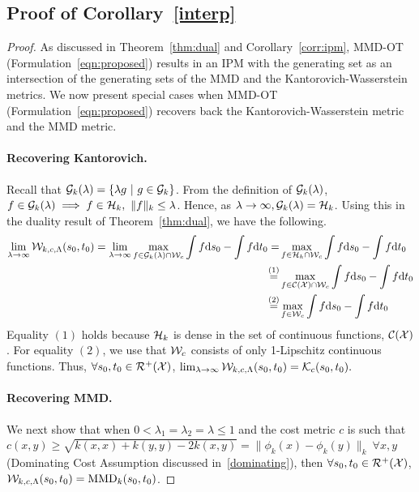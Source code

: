 \subsection[Proof of MMD-OT Interpolating between Kantorovich and MMD]{Proof of Corollary~\ref{interp}}\label{proof:corr-interp}
\interpolant*
\begin{proof}
As discussed in Theorem~\ref{thm:dual} and Corollary~\ref{corr:ipm}, MMD-OT (Formulation~\ref{eqn:proposed}) results in an IPM with the generating set as an intersection of the generating sets of the MMD and the Kantorovich-Wasserstein metrics.
We now present special cases when MMD-OT (Formulation~\ref{eqn:proposed}) recovers back the Kantorovich-Wasserstein metric and the MMD metric.
\paragraph{Recovering Kantorovich.} Recall that $\mathcal{G}_k(\lambda)=\{\lambda g~|~ g\in \mathcal{G}_k\}$. From the definition of $\mathcal{G}_k(\lambda)$, $f\in \mathcal{G}_k(\lambda)\implies f\in \mathcal{H}_k,~ \|f\|_k\leq \lambda$. Hence, as $\lambda\rightarrow \infty, \mathcal{G}_k(\lambda)=\mathcal{H}_k$. Using this in the duality result of Theorem~\ref{thm:dual}, we have the following.
\begin{align*}
\lim_{\lambda\rightarrow \infty}\mathcal{W}_{k, c, \Lambda}(s_0, t_0)=\lim_{\lambda\rightarrow \infty}\max\limits_{f\in \mathcal{G}_k(\lambda)\cap \mathcal{W}_c}\int f \textup{d}s_0 - \int f \textup{d}t_0=&\max\limits_{f\in \mathcal{H}_k\cap \mathcal{W}_c}\int f \textup{d}s_0 - \int f \textup{d}t_0\\
\stackrel{(1)}{=}& \max\limits_{f\in \mathcal{C}(\mathcal{X})\cap \mathcal{W}_c}\int f \textup{d}s_0 - \int f \textup{d}t_0\\
\stackrel{(2)}{=}& \max\limits_{f\in \mathcal{W}_c}\int f \textup{d}s_0 - \int f \textup{d}t_0
\end{align*}
Equality $(1)$ holds because $\mathcal{H}_k$ is dense in the set of continuous functions, $\mathcal{C}(\mathcal{X})$. For equality $(2)$, we use that $\mathcal{W}_c$ consists of only 1-Lipschitz continuous functions. Thus, $\forall s_0, t_0\in \mathcal{R}^+(\mathcal{X})$, $\lim_{\lambda\rightarrow\infty}\mathcal{W}_{k, c, \Lambda}(s_0, t_0)=\mathcal{K}_c(s_0, t_0).$ 

\paragraph{Recovering MMD.} We next show that when $0<\lambda_1=\lambda_2=\lambda\leq 1$ and the cost metric $c$ is such that 
\newline
$c(x, y)\geq \sqrt{k(x, x)+k(y, y)-2k(x, y)}=\|\phi_k(x)-\phi_k(y)\|_k~\forall x, y$ (Dominating Cost Assumption discussed in~\ref{dominating}), then $\forall s_0, t_0\in\mathcal{R}^+(\mathcal{X})$,  $\mathcal{W}_{k, c, \Lambda}(s_0, t_0)=\textup{MMD}_k(s_0, t_0)$.


\end{proof}
